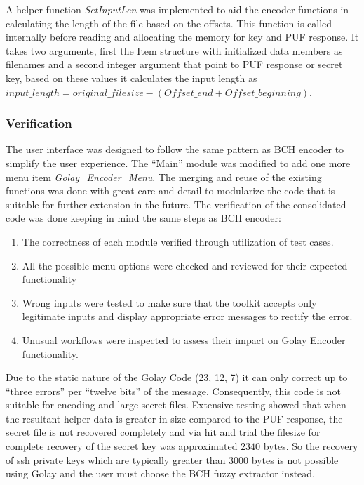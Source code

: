 	A helper function \emph{SetInputLen} was implemented to aid the encoder functions in calculating the length of the file based on the offsets. This function is called internally before reading and allocating the memory for key and PUF response. It takes two arguments, first the Item structure with initialized data members as filenames and a second integer argument that point to PUF response or secret key, based on these values it calculates the input length as $input\_length =
	original\_filesize - (Offset\_end + Offset\_beginning)$. \\

	\subsubsection{Verification}
	The user interface was designed to follow the same pattern as BCH encoder to simplify the user experience. The ``Main'' module was modified to add one more menu item \emph{Golay\_Encoder\_Menu}. The merging and reuse of the existing functions was done with great care and detail to modularize the code that is suitable for further extension in the future. The verification of the consolidated code was done keeping in mind the same steps as BCH encoder:
	\begin{enumerate}
		\item The correctness of each module verified through utilization of test cases.
		\item All the possible menu options were checked and reviewed for their expected functionality
		\item Wrong inputs were tested to make sure that the toolkit accepts only legitimate inputs and display appropriate error messages to rectify the error.
		\item Unusual workflows were inspected to assess their impact on Golay Encoder functionality.
	\end{enumerate}

	Due to the static nature of the Golay Code (23, 12, 7) it can only correct up to ``three errors'' per ``twelve bits'' of the message. Consequently, this code is not suitable for encoding and large secret files. Extensive testing showed that when the resultant helper data is greater in size compared to the PUF response, the secret file is not recovered completely and via hit and trial the filesize for complete recovery of the secret key was approximated $2340$ bytes. So the recovery of ssh private keys which are
	typically greater than 3000 bytes is not possible using Golay and the user must choose the BCH fuzzy extractor instead.

